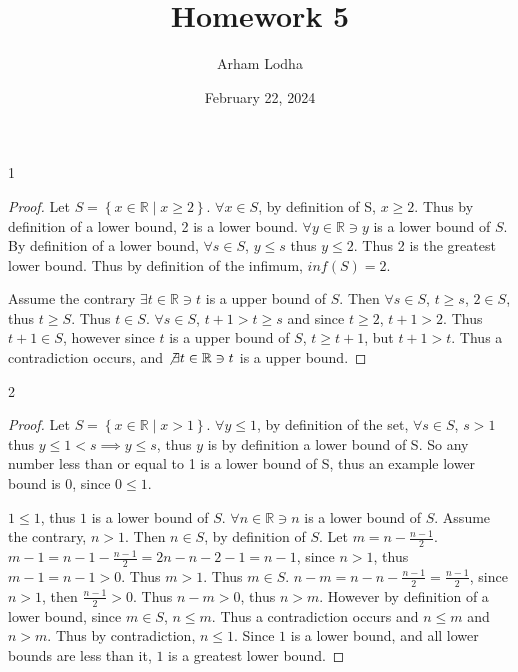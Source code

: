 \documentclass{article}
\newcommand{\R}{\mathbb{R}}
\begin{document}
\title{Homework 5}
\author{Arham Lodha}%
\date{February 22, 2024}%
\maketitle

\begin{PROB}{1}\label{Problem 1.}
\end{PROB}
\begin{proof}
    Let $S = \left\{ x \in \R \mid x \geq 2 \right\}$. $\forall x \in S$, by definition of S, $x \geq 2$. Thus by definition of a lower bound, 2 is a lower bound. $\forall y \in \R \ni y$ is a lower bound of $S$. By definition of a lower bound, $\forall s \in S$, $y \leq s$ thus $y \leq 2$. Thus 2 is the greatest lower bound. Thus by definition of the infimum, $inf(S) = 2$. 
    
    Assume the contrary $\exists t \in \R \ni t$ is a upper bound of $S$. Then $\forall s \in S$, $t \geq s$, $2 \in S$, thus $t \geq S$. Thus $t \in S$. $\forall s \in S$, $t + 1 > t \geq s$ and since $t \geq 2$, $t + 1 > 2$. Thus $t + 1 \in S$, however since $t$ is a upper bound of $S$, $t \geq t + 1$, but $t + 1 > t$. Thus a contradiction occurs, and $\not \exists t \in \R \ni  t $ is a upper bound.                  
\end{proof}

\bigskip

\begin{PROB}{2}\label{Problem 2.}
\end{PROB}
\begin{proof}
    Let $S = \left\{ x \in \R \mid x > 1 \right\}$. $\forall y \leq 1$, by definition of the set, $\forall s \in S$, $s > 1$ thus $y \leq 1 < s \implies y \leq s$, thus $y$ is by definition a lower bound of S. So any number less than or equal to 1 is a lower bound of S, thus an example lower bound is $0$, since $0 \leq 1$.
    
    $1 \leq 1$, thus $1$ is a lower bound of $S$. $\forall n \in \R \ni n$ is a lower bound of $S$. Assume the contrary, $n > 1$. Then $n \in S$, by definition of $S$. Let $m = n - \frac{n - 1}{2}$. $m - 1 = n - 1 - \frac{n - 1}{2} = 2n - n - 2 - 1 = n - 1$, since $n > 1$, thus $m - 1= n - 1 > 0$. Thus $m > 1$. Thus $m \in S$. $n - m = n - n  - \frac{n - 1}{2} = \frac{n - 1}{2}$, since $n > 1$, then $\frac{n - 1}{2} > 0$. Thus $n - m > 0$, thus $n > m$. However by definition of a lower bound, since $m \in S$, $n \leq m$. Thus a contradiction occurs and $n \leq m$ and $n > m$. Thus by contradiction, $n \leq 1$. Since $1$ is a lower bound, and all lower bounds are less than it, $1$ is a greatest lower bound.                       
\end{proof}
\end{document}
